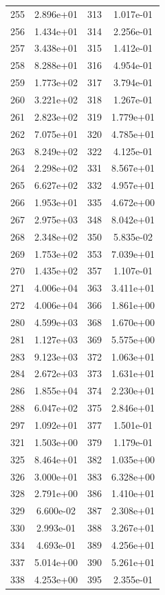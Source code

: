 \documentclass[12pt]{article}
\begin{document}
\begin{longtable}{@{}cccc@{}}
255 & 2.896e+01 & 313 & 1.017e-01 \\
256 & 1.434e+01 & 314 & 2.256e-01 \\
257 & 3.438e+01 & 315 & 1.412e-01 \\
258 & 8.288e+01 & 316 & 4.954e-01 \\
259 & 1.773e+02 & 317 & 3.794e-01 \\
260 & 3.221e+02 & 318 & 1.267e-01 \\
261 & 2.823e+02 & 319 & 1.779e+01 \\
262 & 7.075e+01 & 320 & 4.785e+01 \\
263 & 8.249e+02 & 322 & 4.125e-01 \\
264 & 2.298e+02 & 331 & 8.567e+01 \\
265 & 6.627e+02 & 332 & 4.957e+01 \\
266 & 1.953e+01 & 335 & 4.672e+00 \\
267 & 2.975e+03 & 348 & 8.042e+01 \\
268 & 2.348e+02 & 350 & 5.835e-02 \\
269 & 1.753e+02 & 353 & 7.039e+01 \\
270 & 1.435e+02 & 357 & 1.107e-01 \\
271 & 4.006e+04 & 363 & 3.411e+01 \\
272 & 4.006e+04 & 366 & 1.861e+00 \\
280 & 4.599e+03 & 368 & 1.670e+00 \\
281 & 1.127e+03 & 369 & 5.575e+00 \\
283 & 9.123e+03 & 372 & 1.063e+01 \\
284 & 2.672e+03 & 373 & 1.631e+01 \\
286 & 1.855e+04 & 374 & 2.230e+01 \\
288 & 6.047e+02 & 375 & 2.846e+01 \\
297 & 1.092e+01 & 377 & 1.501e-01 \\
321 & 1.503e+00 & 379 & 1.179e-01 \\
325 & 8.464e+01 & 382 & 1.035e+00 \\
326 & 3.000e+01 & 383 & 6.328e+00 \\
328 & 2.791e+00 & 386 & 1.410e+01 \\
329 & 6.600e-02 & 387 & 2.308e+01 \\
330 & 2.993e-01 & 388 & 3.267e+01 \\
334 & 4.693e-01 & 389 & 4.256e+01 \\
337 & 5.014e+00 & 390 & 5.261e+01 \\
338 & 4.253e+00 & 395 & 2.355e-01 \\

\end{longtable}
\end{document}
